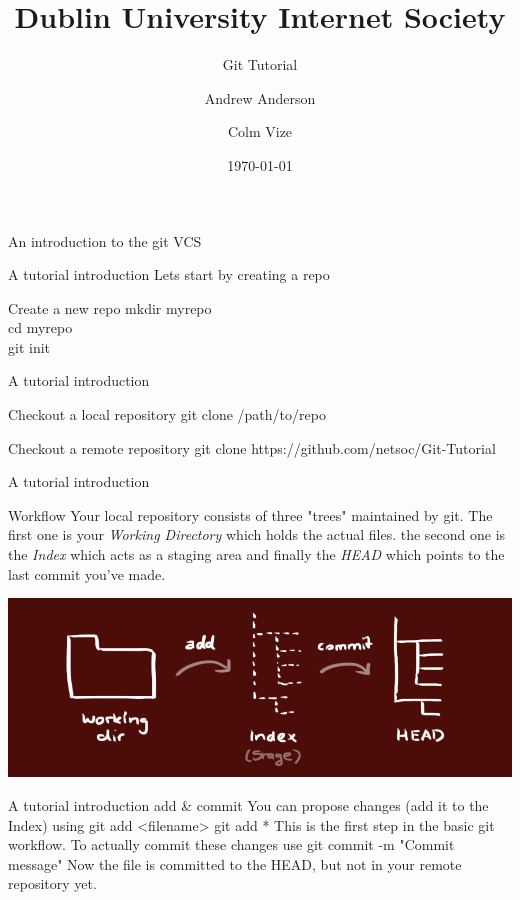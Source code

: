 \documentclass[xcolor=dvipsnames]{beamer}
\begin{document}
\title[Netsoc Git Tutorial] {Dublin University Internet Society}
\author[A. Anderson \& C. Vize]{Andrew Anderson  \and Colm Vize }
\subtitle{Git Tutorial}{An introduction to the git VCS}
\date{\today}
\titlepage
\begin{frame}{A tutorial introduction}
	Lets start by creating a repo
	\begin{block}{Create a new repo}
		mkdir myrepo\\
		cd myrepo\\
		git init
	\end{block}
\end{frame}

\begin{frame}{A tutorial introduction}
	
	\begin{block}{Checkout a local repository}
		git clone /path/to/repo
	\end{block}
	\begin{block}{Checkout a remote repository}
		git clone https://github.com/netsoc/Git-Tutorial 
	\end{block}
\end{frame}

\begin{frame}{A tutorial introduction}

	\begin{block}{Workflow}
		Your local repository consists of three "trees" maintained by git. The first one is 
		your \emph{Working Directory} which holds the actual files. the second one is the \emph{Index} which acts as a staging area and finally the \emph{HEAD} which points to the last commit you've made.
	\end{block}
	\begin{center}
		\includegraphics[scale=0.3]{trees.png}
	\end{center}
\end{frame}

\begin{frame}{A tutorial introduction}
	add & commit
You can propose changes (add it to the Index) using
git add <filename>
git add *
This is the first step in the basic git workflow. To actually commit these changes use
git commit -m "Commit message"
Now the file is committed to the HEAD, but not in your remote repository yet.
\end{frame}
\end{document}
